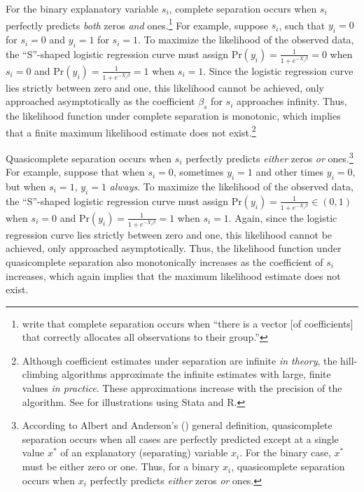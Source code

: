 \documentclass[12pt]{article}
\begin{document}
For the binary explanatory variable $s_i$, complete separation occurs when $s_i$ perfectly predicts \emph{both} zeros \emph{and} ones.\footnote{
\citet[p. 38]{AlbertAnderson1984} write that complete separation occurs when ``there is a vector [of coefficients] that correctly allocates all observations to their group.''} 
For example, suppose $s_i$, such that $y_i = 0$ for $s_i = 0$ and $y_i = 1$ for $s_i = 1$. 
To maximize the likelihood of the observed data, the ``S''-shaped logistic regression curve must assign $\text{Pr}(y_i) = \frac{1}{1 + e^{-X_i\beta}} = 0$ when $s_i  = 0$ and $\text{Pr}(y_i) = \frac{1}{1 + e^{-X_i\beta}} = 1$ when $s_i = 1$. 
Since the logistic regression curve lies strictly between zero and one, this likelihood cannot be achieved, only approached asymptotically as the coefficient $\beta_s$ for $s_i$ approaches infinity. 
Thus, the likelihood function under complete separation is monotonic, which implies that a finite maximum likelihood estimate does not exist.\footnote{
Although coefficient estimates under separation are infinite \emph{in theory}, the hill-climbing algorithms approximate the infinite estimates with large, finite values \emph{in practice}. 
These approximations increase with the precision of the algorithm. 
See \cite{Zorn2005} for illustrations using Stata and R.}

Quasicomplete separation occurs when $s_i$ perfectly predicts \emph{either} zeros \emph{or} ones.\footnote{
According to Albert and Anderson's (\citeyear{AlbertAnderson1984}) general definition, quasicomplete separation occurs when all cases are perfectly predicted except at a single value $x^*$ of an explanatory (separating) variable $x_i$. 
For the binary case, $x^*$ must be either zero or one. 
Thus, for a binary $x_i$, quasicomplete separation occurs when $x_i$ perfectly predicts \emph{either} zeros \emph{or} ones.} 
For example, suppose that when $s_i = 0$, sometimes $y_i = 1$ and other times $y_i = 0$, but when $s_i = 1$, $y_i = 1$ \emph{always}. 
To maximize the likelihood of the observed data, the ``S''-shaped logistic regression curve must assign $\text{Pr}(y_i) = \frac{1}{1 + e^{-X_i\beta}} \in (0, 1)$ when $s_i  = 0$ and $\text{Pr}(y_i) = \frac{1}{1 + e^{-X_i\beta}} = 1$ when $s_i = 1$. 
Again, since the logistic regression curve lies strictly between zero and one, this likelihood cannot be achieved, only approached asymptotically. 
Thus, the likelihood function under quasicomplete separation also monotonically increases as the coefficient of $s_i$ increases, which again implies that the maximum likelihood estimate does not exist.
\end{document}
